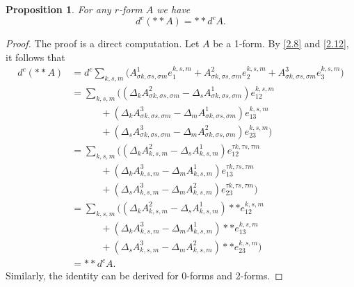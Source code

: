 \documentclass[english]{article}
\theoremstyle{plain}
\newtheorem{prop}[thm]{Proposition}
\theoremstyle{definition}
\theoremstyle{remark}
\numberwithin{equation}{section}
\begin{document}
\begin{prop}
For any $r$-form $A$ we have
\begin{equation}\label{2.13}
 d^c(\ast\ast A)=\ast\ast d^c A.
\end{equation}
\end{prop}
\begin{proof}
The proof is a direct computation. Let $A$ be a 1-form. By \eqref{2.8} and \eqref{2.12}, it follows that
\begin{align*}
d^c(\ast\ast A) &=
d^c \sum_{k,s,m} \big( A^1_{\sigma k, \sigma s, \sigma m}  e_1^{k,s,m} + A^2_{\sigma k, \sigma s, \sigma m}e_2^{k,s,m} + A^3_{\sigma k, \sigma s, \sigma m}e_3^{k,s,m} \big) \\
&= \sum_{k,s,m} \big( (\Delta_k A^2_{\sigma k, \sigma s, \sigma m} - \Delta_s A^1_{\sigma k, \sigma s, \sigma m})e_{12}^{k,s,m} \\
&\qquad\quad + (\Delta_k A^3_{\sigma k, \sigma s, \sigma m} - \Delta_m A^1_{\sigma k, \sigma s, \sigma m})e_{13}^{k,s,m} \\
&\qquad\quad + (\Delta_s A^3_{\sigma k, \sigma s, \sigma m} - \Delta_m A^2_{\sigma k, \sigma s, \sigma m})e_{23}^{k,s,m} \big ) \\
&= \sum_{k,s,m} \big( (\Delta_k A^2_{k, s, m} - \Delta_s A^1_{k, s, m})e_{12}^{\tau k,\tau s, \tau m} \\
&\qquad\quad + (\Delta_k A^3_{k, s, m} - \Delta_m A^1_{k, s, m})e_{13}^{\tau k, \tau s, \tau m} \\
&\qquad\quad + (\Delta_s A^3_{k, s, m} - \Delta_m A^2_{k, s, m})e_{23}^{\tau k, \tau s, \tau m} \big) \\
&= \sum_{k,s,m} \big( (\Delta_k A^2_{k, s, m} - \Delta_s A^1_{k, s, m})\ast\ast e_{12}^{k, s, m} \\
&\qquad\quad + (\Delta_k A^3_{k, s, m} - \Delta_m A^1_{k, s, m})\ast\ast e_{13}^{k, s, m} \\
&\qquad\quad + (\Delta_s A^3_{k, s, m} - \Delta_m A^2_{k, s, m})\ast\ast e_{23}^{k, s, m} \big) \\
&=\ast\ast d^c A.
\end{align*}
Similarly, the identity can be derived for 0-forms and 2-forms.
\end{proof}
\end{document}
